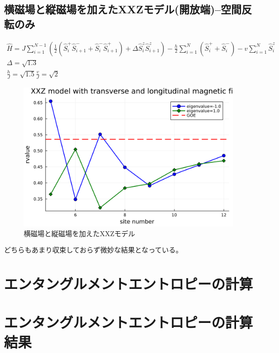 \documentclass{ltjsarticle}
\begin{document}
\subsection*{横磁場と縦磁場を加えたXXZモデル(開放端)--空間反転のみ}
\begin{gather}
  \hat{H}=J\sum_{i=1}^{N-1} \left(\frac{1}{2}(\hat{S}_i^+\hat{S}_{i+1}^- + \hat{S}_i^-\hat{S}_{i+1}^+) + \Delta\hat{S}_i^z\hat{S}_{i+1}^z\right)  - \frac{h}{2}\sum_{i=1}^{N} \left( \hat{S}_i^+ + \hat{S}_i^- \right) - v\sum_{i=1}^{N} \hat{S}_i^z\\
  \Delta=\sqrt{1.3}\\
  \frac{h}{J}=\sqrt{1.5}
  \frac{v}{J}=\sqrt{2}
\end{gather}
\begin{figure}[H]
  \centering
  \includegraphics[width=150mm]{rvalue_xxz.png}
  \caption{横磁場と縦磁場を加えたXXZモデル}
  \label{fig:rvalue_xxz}
\end{figure}
どちらもあまり収束しておらず微妙な結果となっている。\\
\section{エンタングルメントエントロピーの計算}
\section{エンタングルメントエントロピーの計算結果}
\end{document}
